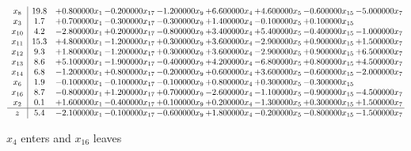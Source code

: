 \documentclass[10pt]{article}
\begin{document}
 \[\begin{array}{c| c c@{\hskip 2pt} c@{\hskip 2pt} c@{\hskip 2pt} c@{\hskip 2pt} c@{\hskip 2pt} c@{\hskip 2pt} c@{\hskip 2pt} }
 x_{8}   &  19.8 & + 0.800000 x_{1} & -0.200000 x_{17} & -1.200000 x_{9} & + 6.600000 x_{4} & + 4.600000 x_{5} & -0.600000 x_{15} & -5.000000 x_{7}\\
 x_{3}   &  1.7 & + 0.700000 x_{1} & -0.300000 x_{17} & -0.300000 x_{9} & + 1.400000 x_{4} & -0.100000 x_{5} & + 0.100000 x_{15} &   \\
 x_{10}   &  4.2 & -2.800000 x_{1} & + 0.200000 x_{17} & -0.800000 x_{9} & + 3.400000 x_{4} & + 5.400000 x_{5} & -0.400000 x_{15} & -1.000000 x_{7}\\
 x_{11}   &  15.3 & + 4.800000 x_{1} & -1.200000 x_{17} & + 0.300000 x_{9} & + 3.600000 x_{4} & -2.900000 x_{5} & + 0.900000 x_{15} & + 1.500000 x_{7}\\
 x_{12}   &  9.3 & + 1.800000 x_{1} & -1.200000 x_{17} & + 0.300000 x_{9} & + 3.600000 x_{4} & -2.900000 x_{5} & + 0.900000 x_{15} & + 6.500000 x_{7}\\
 x_{13}   &  8.6 & + 5.100000 x_{1} & -1.900000 x_{17} & -0.400000 x_{9} & + 4.200000 x_{4} & -6.800000 x_{5} & + 0.800000 x_{15} & + 4.500000 x_{7}\\
 x_{14}   &  6.8 & -1.200000 x_{1} & + 0.800000 x_{17} & -0.200000 x_{9} & + 0.600000 x_{4} & + 3.600000 x_{5} & -0.600000 x_{15} & -2.000000 x_{7}\\
 x_{6}   &  1.9 & -0.100000 x_{1} & -0.100000 x_{17} & -0.100000 x_{9} & + 0.800000 x_{4} & + 0.300000 x_{5} & -0.300000 x_{15} &   \\
 x_{16}   &  8.7 & -0.800000 x_{1} & + 1.200000 x_{17} & + 0.700000 x_{9} & -2.600000 x_{4} & -1.100000 x_{5} & -0.900000 x_{15} & -4.500000 x_{7}\\
 x_{2}   &  0.1 & + 1.600000 x_{1} & -0.400000 x_{17} & + 0.100000 x_{9} & + 0.200000 x_{4} & -1.300000 x_{5} & + 0.300000 x_{15} & + 1.500000 x_{7}\\
\hline
z    &  5.4 & -2.100000 x_{1} & -0.100000 x_{17} & -0.600000 x_{9} & + 1.800000 x_{4} & -0.200000 x_{5} & -0.800000 x_{15} & -1.500000 x_{7}\\
\end{array}\]


 $ x_{4} $ enters and $ x_{16} $ leaves 
\end{document}
